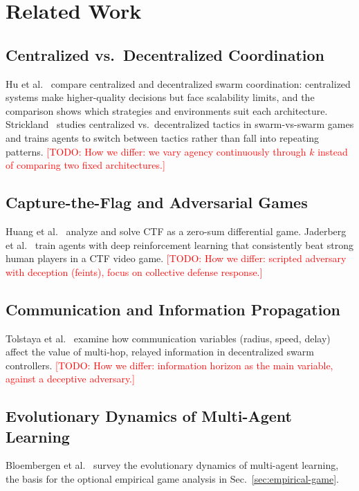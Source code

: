 \documentclass[conference]{IEEEtran}
\newcommand{\todo}[1]{\textcolor{red}{[TODO: #1]}}
\newcommand{\hor}{k}           %
\begin{document}
\section{Related Work}
\label{sec:related}

\subsection{Centralized vs.\ Decentralized Coordination}
Hu et al.~\cite{hu2018centralize} compare centralized and decentralized swarm coordination: centralized systems make higher-quality decisions but face scalability limits, and the comparison shows which strategies and environments suit each architecture. Strickland~\cite{strickland2022thesis} studies centralized vs.\ decentralized tactics in swarm-vs-swarm games and trains agents to switch between tactics rather than fall into repeating patterns.
\todo{How we differ: we vary agency continuously through $\hor$ instead of comparing two fixed architectures.}

\subsection{Capture-the-Flag and Adversarial Games}
Huang et al.~\cite{huang2015automation} analyze and solve CTF as a zero-sum differential game. Jaderberg et al.~\cite{jaderberg2018human} train agents with deep reinforcement learning that consistently beat strong human players in a CTF video game.
\todo{How we differ: scripted adversary with deception (feints), focus on collective defense response.}

\subsection{Communication and Information Propagation}
Tolstaya et al.~\cite{tolstaya2020gnn} examine how communication variables (radius, speed, delay) affect the value of multi-hop, relayed information in decentralized swarm controllers.
\todo{How we differ: information horizon as the main variable, against a deceptive adversary.}

\subsection{Evolutionary Dynamics of Multi-Agent Learning}
Bloembergen et al.~\cite{bloembergen2015evolutionary} survey the evolutionary dynamics of multi-agent learning, the basis for the optional empirical game analysis in Sec.~\ref{sec:empirical-game}.
\end{document}
